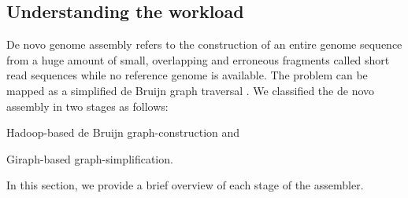 \documentclass[conference]{IEEEtran}
\begin{document}
\subsection {Understanding the workload} \label{TheWorkload}
De novo genome assembly refers to the construction of an entire genome sequence from a huge amount of small, overlapping and erroneous fragments called short read sequences while no reference genome is available.
The problem can be mapped as a simplified de Bruijn graph traversal \cite{bio:debruijngraph}. 
We classified the de novo assembly in two stages as follows:
\begin{inparaenum}
\item Hadoop-based de Bruijn graph-construction and
\item Giraph-based graph-simplification.  
\end{inparaenum}
In this section, we provide a brief overview of each stage of the assembler. 
\end{document}
